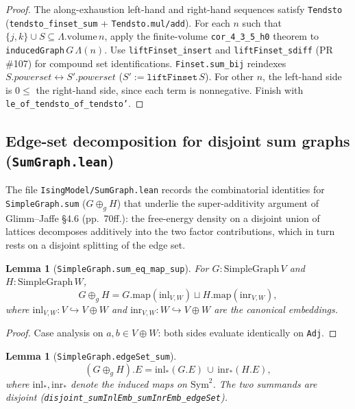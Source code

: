 \documentclass[a4paper,11pt]{article}
\newtheorem{lemma}[theorem]{Lemma}
\begin{document}
\begin{proof}
The along-exhaustion left-hand and right-hand sequences satisfy
\texttt{Tendsto}
(\texttt{tendsto\_finset\_sum} + \texttt{Tendsto.mul/add}).
For each $n$ such that $\{j, k\} \cup S \subseteq \Lambda.\text{volume}\,n$,
apply the finite-volume \texttt{cor\_4\_3\_5\_h0} theorem to
\texttt{inducedGraph}\,$G\,\Lambda(n)$. Use
\texttt{liftFinset\_insert} and \texttt{liftFinset\_sdiff} (PR \#107) for
compound set identifications.
\texttt{Finset.sum\_bij} reindexes $S.powerset \leftrightarrow S'.powerset$
($S' := \texttt{liftFinset}\,S$).
For other $n$, the left-hand side is $0 \le$ the right-hand side, since each
term is nonnegative. Finish with \texttt{le\_of\_tendsto\_of\_tendsto'}.
\end{proof}

\subsection{Edge-set decomposition for disjoint sum graphs (\texttt{SumGraph.lean})}

The file \texttt{IsingModel/SumGraph.lean} records the combinatorial
identities for \texttt{SimpleGraph.sum} ($G \oplus_g H$) that underlie
the super-additivity argument of Glimm--Jaffe \S 4.6 (pp.\ 70ff.):
the free-energy density on a disjoint union of lattices decomposes
additively into the two factor contributions, which in turn rests on
a disjoint splitting of the edge set.

\begin{lemma}[\texttt{SimpleGraph.sum\_eq\_map\_sup}]
For $G : \mathrm{SimpleGraph}\,V$ and $H : \mathrm{SimpleGraph}\,W$,
\[
  G \oplus_g H
    = G.\mathrm{map}(\mathrm{inl}_{V,W})
      \sqcup H.\mathrm{map}(\mathrm{inr}_{V,W}),
\]
where $\mathrm{inl}_{V,W} : V \hookrightarrow V \oplus W$ and
$\mathrm{inr}_{V,W} : W \hookrightarrow V \oplus W$ are the canonical
embeddings.
\end{lemma}

\begin{proof}
Case analysis on $a, b \in V \oplus W$: both sides evaluate
identically on \texttt{Adj}.
\end{proof}

\begin{lemma}[\texttt{SimpleGraph.edgeSet\_sum}]
\[
  (G \oplus_g H).E
    = \mathrm{inl}_*(G.E) \,\cup\, \mathrm{inr}_*(H.E),
\]
where $\mathrm{inl}_*, \mathrm{inr}_*$ denote the induced maps on
$\mathrm{Sym}^2$. The two summands are disjoint
(\texttt{disjoint\_sumInlEmb\_sumInrEmb\_edgeSet}).
\end{lemma}
\end{document}
